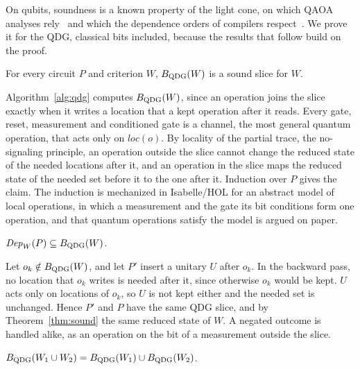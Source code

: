 On qubits, soundness is a known property of the light cone, on which QAOA analyses rely~\cite{farhi2014qaoa} and
which the dependence orders of compilers respect~\cite{murali2019triq}. We prove it for the
QDG, classical bits included, because the results that follow build on the proof.

\begin{theorem}\label{thm:sound}
For every circuit $P$ and criterion $W$, $B_{\mathrm{QDG}}(W)$ is a sound slice for $W$.
\end{theorem}

\begin{IEEEproof}
Algorithm~\ref{alg:qdg} computes $B_{\mathrm{QDG}}(W)$, since an operation joins the slice exactly when it writes a location that a kept operation after it reads. Every gate,
reset, measurement and conditioned gate is a channel, the most general quantum operation, that acts only on $\mathit{loc}(o)$. By locality of the partial
trace, the no-signaling principle, an operation outside the slice cannot change the reduced state of the needed
locations after it, and an operation in the slice maps the reduced state of the needed set before it to the one
after it. Induction over $P$ gives the claim. The induction is mechanized in Isabelle/HOL for an abstract model of
local operations, in which a measurement and the gate its bit conditions form one operation, and that quantum
operations satisfy the model is argued on paper.
\end{IEEEproof}

\begin{proposition}\label{prop:complete}
$\mathit{Dep}_W(P) \subseteq B_{\mathrm{QDG}}(W)$.
\end{proposition}

\begin{IEEEproof}
Let $o_k \notin B_{\mathrm{QDG}}(W)$, and let $P'$ insert a unitary $U$ after $o_k$. In the backward pass, no location that $o_k$ writes is needed after it, since otherwise $o_k$ would be
kept. $U$ acts only on locations of $o_k$, so $U$ is not
kept either and the needed set is unchanged. Hence $P'$ and $P$ have the same QDG slice, and by
Theorem~\ref{thm:sound} the same reduced state of $W$. A negated outcome is handled alike, as an operation on the
bit of a measurement outside the slice.
\end{IEEEproof}

\begin{proposition}\label{prop:joint}
$B_{\mathrm{QDG}}(W_1 \cup W_2) = B_{\mathrm{QDG}}(W_1) \cup B_{\mathrm{QDG}}(W_2)$.
\end{proposition}

